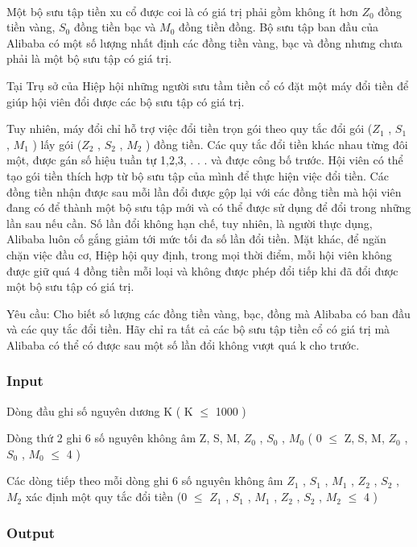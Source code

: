

 

Một bộ sưu tập tiền xu cổ được coi là có giá trị phải gồm không ít hơn $Z_{0}$ đồng tiền vàng, $S_{0}$ đồng tiền bạc và $M_{0}$ đồng tiền đồng. Bộ sưu tập ban đầu của Alibaba có một số lượng nhất định các đồng tiền vàng, bạc và đồng nhưng chưa phải là một bộ sưu tập có giá trị.

Tại Trụ sở của Hiệp hội những người sưu tầm tiền cổ có đặt một máy đổi tiền để giúp hội viên đổi được các bộ sưu tập có giá trị.

Tuy nhiên, máy đổi chỉ hỗ trợ việc đổi tiền trọn gói theo quy tắc đổi gói ($Z_{1}$ , $S_{1}$ , $M_{1}$ ) lấy gói ($Z_{2}$ , $S_{2}$ , $M_{2}$ ) đồng tiền. Các quy tắc đổi tiền khác nhau từng đôi một, được gán số hiệu tuần tự 1,2,3, . . . và được công bố trước. Hội viên có thể tạo gói tiền thích hợp từ bộ sưu tập của mình để thực hiện việc đổi tiền. Các đồng tiền nhận được sau mỗi lần đổi được gộp lại với các đồng tiền mà hội viên đang có để thành một bộ sưu tập mới và có thể được sử dụng để đổi trong những lần sau nếu cần. Số lần đổi không hạn chế, tuy nhiên, là người thực dụng, Alibaba luôn cố gắng giảm tới mức tối đa số lần đổi tiền. Mặt khác, để ngăn chặn việc đầu cơ, Hiệp hội quy định, trong mọi thời điểm, mỗi hội viên không được giữ quá 4 đồng tiền mỗi loại và không được phép đổi tiếp khi đã đổi được một bộ sưu tập có giá trị.

Yêu cầu: Cho biết số lượng các đồng tiền vàng, bạc, đồng mà Alibaba có ban đầu và các quy tắc đổi tiền. Hãy chỉ ra tất cả các bộ sưu tập tiền cổ có giá trị mà Alibaba có thể có được sau một số lần đổi không vượt quá k cho trước.

\subsubsection{Input}

Dòng đầu ghi số nguyên dương K ( K  $\le$  1000 )

Dòng thứ 2 ghi 6 số nguyên không âm Z, S, M, $Z_{0}$ , $S_{0}$ , $M_{0}$ ( 0  $\le$  Z, S, M, $Z_{0}$ , $S_{0}$ , $M_{0}$  $\le$  4 )

Các dòng tiếp theo mỗi dòng ghi 6 số nguyên không âm $Z_{1}$ , $S_{1}$ , $M_{1}$ , $Z_{2}$ , $S_{2}$ , $M_{2}$ xác định một quy tắc đổi tiền (0  $\le$  $Z_{1}$ , $S_{1}$ , $M_{1}$ , $Z_{2}$ , $S_{2}$ , $M_{2}$  $\le$  4 )

\subsubsection{Output}

